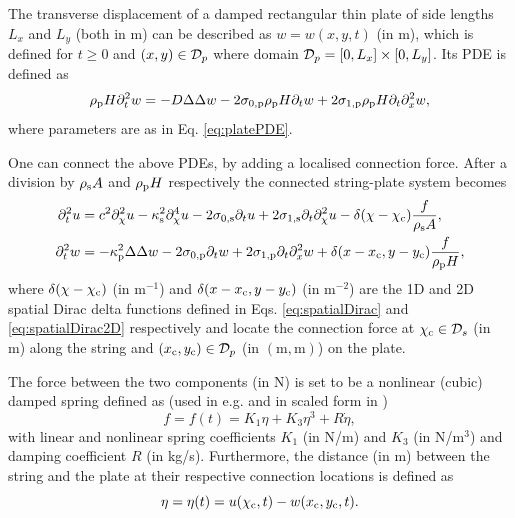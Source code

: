 The transverse displacement of a damped rectangular thin plate of side lengths $L_x$ and $L_y$ (both in m) can be described as $w=w(x,y,t)$ (in m), which is defined for $t\geq 0$ and $(x,y)\in \mathcal{D}_p$ where domain $\mathcal{D}_p = [0, L_x] \times [0, L_y]$. Its PDE is defined as
\begin{equation}
    \rho_\ptxt H\ptt w = -D\Delta\Delta w - 2\szX[\ptxt]\rho_\ptxt H\pt w + 2\soX[\ptxt] \rho_\ptxt H\pt\pxx w,
\end{equation}
where parameters are as in Eq. \eqref{eq:platePDE}.

One can connect the above PDEs, by adding a localised connection force. After a division by $\rho_{\text{s}} A$ and $\rho_{\text{p}} H$ respectively the connected string-plate system becomes
\begin{subequations}\label{eq:connStringPlatePDEs}
    \begin{align}
        \ptt u &= c^2 \partial_{\chi}^2 u - \kappa_\stxt^2 \partial_{\chi}^4 u - 2\szX[\stxt]\pt u + 2\soX[\stxt] \pt\partial_{\chi}^2 u - \delta(\chi-\chi_\ctxt)\frac{f}{\rho_\stxt A},\\
    \ptt w &= -\kappa_\ptxt^2\Delta\Delta w - 2\szX[\ptxt]\pt w + 2\soX[\ptxt] \pt\pxx w + \delta(x-x_\ctxt, y-y_\ctxt)\frac{f}{ \rho_\ptxt H},
    \end{align}
\end{subequations}
where $\delta(\chi-\chi_{\text{c}})$ (in m$^{-1}$) and $\delta(x-x_{\text{c}}, y-y_{\text{c}})$ (in m$^{-2}$) are the 1D and 2D spatial Dirac delta functions defined in Eqs. \eqref{eq:spatialDirac} and \eqref{eq:spatialDirac2D} respectively and locate the connection force at $\chi_{\text{c}} \in \mathcal{D}_s$ (in m) along the string and $(x_{\text{c}},y_{\text{c}})\in \mathcal{D}_p$ (in $(\text{m}, \text{m})$) on the plate.

The force between the two components (in N) is set to be a nonlinear (cubic) damped spring defined as (used in e.g. \cite{Webb2015} and in scaled form in \cite{Bilbao2009Modular})
\begin{equation}\label{eq:nonlinearForce}
    f = f(t) = K_1\eta+K_3\eta^3+R \dot\eta,
\end{equation}
with linear and nonlinear spring coefficients $K_1$ (in N/m) and $K_3$ (in N/m$^3$) and damping coefficient $R$ (in kg/s). Furthermore, the distance (in m) between the string and the plate at their respective connection locations is defined as
\begin{equation}
    \eta = \eta(t) = u(\chi_{\text{c}}, t) - w(x_{\text{c}}, y_{\text{c}}, t).
\end{equation}


